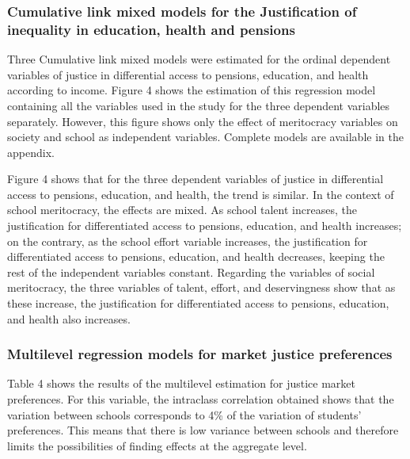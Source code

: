 \documentclass[
  letterpaper,
  DIV=11,
  numbers=noendperiod]{scrartcl}
\begin{document}
\hypertarget{cumulative-link-mixed-models-for-the-justification-of-inequality-in-education-health-and-pensions}{%
\subsubsection{Cumulative link mixed models for the Justification of
inequality in education, health and
pensions}\label{cumulative-link-mixed-models-for-the-justification-of-inequality-in-education-health-and-pensions}}

Three Cumulative link mixed models were estimated for the ordinal
dependent variables of justice in differential access to pensions,
education, and health according to income. Figure 4 shows the estimation
of this regression model containing all the variables used in the study
for the three dependent variables separately. However, this figure shows
only the effect of meritocracy variables on society and school as
independent variables. Complete models are available in the appendix.

Figure 4 shows that for the three dependent variables of justice in
differential access to pensions, education, and health, the trend is
similar. In the context of school meritocracy, the effects are mixed. As
school talent increases, the justification for differentiated access to
pensions, education, and health increases; on the contrary, as the
school effort variable increases, the justification for differentiated
access to pensions, education, and health decreases, keeping the rest of
the independent variables constant. Regarding the variables of social
meritocracy, the three variables of talent, effort, and deservingness
show that as these increase, the justification for differentiated access
to pensions, education, and health also increases.

\hypertarget{multilevel-regression-models-for-market-justice-preferences}{%
\subsubsection{Multilevel regression models for market justice
preferences}\label{multilevel-regression-models-for-market-justice-preferences}}

Table 4 shows the results of the multilevel estimation for justice
market preferences. For this variable, the intraclass correlation
obtained shows that the variation between schools corresponds to 4\% of
the variation of students' preferences. This means that there is low
variance between schools and therefore limits the possibilities of
finding effects at the aggregate level.
\end{document}
